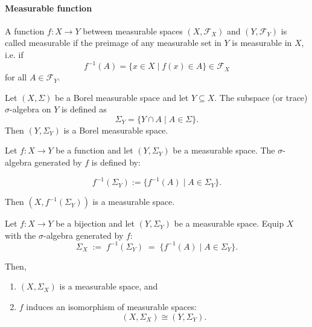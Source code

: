 \paragraph{Measurable function} A function $f \colon X \to Y$ between measurable spaces $(X, \mathcal{F}_X)$ and $(Y, \mathcal{F}_Y)$ is called measurable if the preimage of any measurable set in $Y$ is measurable in $X$, i.e. if 
\[
	f^{-1}(A) = \{x \in X \mid f(x) \in A\} \in \mathcal{F}_X
\]
for all $A \in \mathcal{F}_Y$.

\begin{definition}\label{def:subspace-sigma-algebra}
	Let $(X, \Sigma)$ be a Borel measurable space and let $Y \subseteq X$. 
	The subspace (or trace) $\sigma$-algebra on $Y$ is defined as
	\[
	\Sigma_Y = \{ Y \cap A \mid A \in \Sigma \}.
	\]
	Then $(Y, \Sigma_Y)$ is a Borel measurable space.
\end{definition}

\begin{definition}\label{def:pullback}
	Let $f \colon X \to Y$ be a function and let $(Y, \Sigma_Y)$ be a measurable space. The $\sigma$-algebra generated by $f$ is defined by:

	\[
		f^{-1}(\Sigma_Y) := \{f^{-1}(A) \mid A \in \Sigma_Y\}.
	\]

	Then $(X, f^{-1}(\Sigma_Y))$ is a measurable space.
\end{definition}

\begin{lemma}\label{lem:pullback-iso}
	Let $f : X \to Y$ be a bijection and let $(Y,\Sigma_Y)$ be a measurable space.
	Equip $X$ with the $\sigma$-algebra generated by $f$:
	\[
	\Sigma_X \;:=\; f^{-1}(\Sigma_Y) \;=\; \{ f^{-1}(A) \mid A \in \Sigma_Y\}.
	\]

	Then,
	\begin{enumerate}
		\item $(X, \Sigma_X)$ is a measurable space, and
		\item $f$ induces an isomorphism of measurable spaces: 
		\[
			(X,\Sigma_X) \cong (Y,\Sigma_Y).
		\]
	\end{enumerate}
\end{lemma}
	
